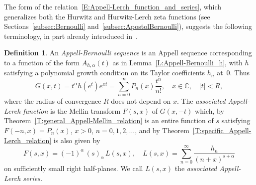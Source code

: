 \documentclass[11pt,a4paper]{amsart}
\newcommand{\C}{\mathbb{C}}
\newcommand{\pochhammer}[2]{(#1)_{#2}}
\theoremstyle{plain}
\theoremstyle{plain}
\theoremstyle{definition}
\newtheorem{definition}{Definition}
\theoremstyle{remark}
\begin{document}
The form of the relation~\eqref{E:Appell-Lerch_function_and_series}, which generalizes both the Hurwitz and Hurwitz-Lerch zeta functions (see Sections~\ref{subsec:Bernoulli} and~\ref{subsec:ApostolBernoulli}),
suggests the following terminology, in part already introduced in~\cite{BaChi}.


\begin{definition} 
\label{D:AppellBernoulli_data}	
An \emph{Appell-Bernoulli sequence} is an Appell sequence corresponding to a function of the form $A_{h,\alpha}(t)$ as in Lemma~\ref{L:Appell-Bernoulli_h}, with $h$ satisfying a polynomial growth condition on its Taylor coefficients $h_{n}$ at~$0$. Thus
\begin{equation}
\label{E:Appell-Bernoulli_GF}
    G(x,t) = t^\alpha h(e^t) e^{xt}
	       = \sum_{n=0}^\infty P_{n}(x) \frac{t^n}{n!},
		     \quad x\in \C,\quad |t| < R,
\end{equation}
where the radius of convergence $R$ does not depend on $x$.
The \emph{associated Appell-Lerch function} is the Mellin transform $F(s,x)$ of $G(x,-t)$ which, by Theorem~\ref{T:general_Appell-Mellin_relation} is an entire function of $s$ satisfying $F(-n,x) = P_{n}(x)$, $x>0$, $n=0,1,2,\dots$, and by Theorem~\ref{T:specific_Appell-Lerch_relation} is also given by
% 
\begin{equation}
\label{E:MellinLerch}
    F(s,x) = (-1)^\alpha \, \pochhammer{s}{\alpha}
	\, L(s,x),
	\quad
	L(s,x) = \sum_{n=0}^\infty \frac{h_{n}}{(n + x)^{s+\alpha}}
\end{equation}
% 
on sufficiently small right half-planes. We call $L(s,x)$ the \emph{associated Appell-Lerch series.}
\end{definition}
\end{document}

